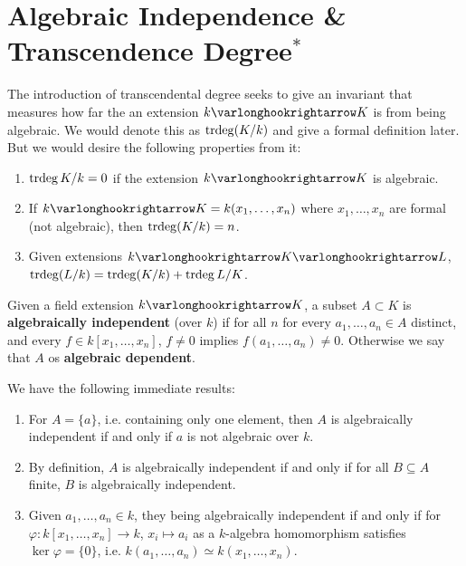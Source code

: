 \documentclass{article}
\begin{document}
\section{Algebraic Independence \& Transcendence Degree$^{\ast}$}

\textstart
The introduction of transcendental degree seeks to give an invariant that measures how far the an extension $k \ext K$ is from being algebraic. We would denote this as $\operatorname{trdeg}(K/k)$ and give a formal definition later. But we would desire the following properties from it:
\begin{enumerate}[label=\arabic*)]
    \item $\operatorname{trdeg}{K/k} = 0$ if the extension $k \ext K$ is algebraic. 
    \item If $k \ext K = k(x_1, \dots, x_n)$ where $x_1, \dots, x_n$ are formal (not algebraic), then $\operatorname{trdeg}(K/k) = n$.
    \item Given extensions $k \ext K \ext L$, $\operatorname{trdeg}(L/k) = \operatorname{trdeg}(K/k) + \operatorname{trdeg}{L/K}$.
\end{enumerate}

\begin{definition}
    Given a field extension $k \ext K$, a subset $A \subset K$ is \textbf{algebraically independent} (over $k$) if for all $n$ for every $a_1, \dots, a_n \in A$ distinct, and every $f \in k[x_1, \dots, x_n]$, $f \neq 0$ implies $f(a_1, \dots, a_n) \neq 0$. Otherwise we say that $A$ os \textbf{algebraic dependent}.
\end{definition}

\begin{remark}
    We have the following immediate results:
    \begin{enumerate}[label=\arabic*)]
        \item For $A = \{a\}$, i.e. containing only one element, then $A$ is algebraically independent if and only if $a$ is not algebraic over $k$. 
        \item By definition, $A$ is algebraically independent if and only if for all $B \subseteq A$ finite, $B$ is algebraically independent. 
        \item Given $a_1, \dots, a_n \in k$, they being algebraically independent if and only if for $\varphi: k[x_1, \dots, x_n] \to k$, $x_i \mapsto a_i$ as a $k$-algebra homomorphism satisfies $\ker \varphi = \{0\}$, i.e. $k(a_1, \dots, a_n) \simeq k(x_1, \dots, x_n)$.
    \end{enumerate}
\end{remark}
\end{document}
